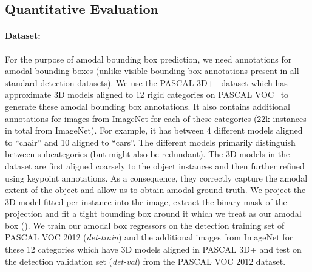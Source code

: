 \subsection{Quantitative Evaluation}
\paragraph{Dataset:} For the purpose of amodal bounding box prediction, we need annotations for amodal bounding boxes (unlike visible bounding box annotations present in all standard detection datasets). We use the PASCAL 3D+~\cite{pascal3d} dataset which has approximate 3D models aligned to 12 rigid categories on PASCAL VOC~\cite{pascal-voc-2012} to generate these amodal bounding box annotations. It also contains additional annotations for images from ImageNet \cite{imagenet_cvpr09} for each of these categories (22k instances in total from ImageNet). For example, it has between 4 different models aligned to ``chair'' and 10 aligned to ``cars''. The different models primarily distinguish between subcategories (but might also be redundant). The 3D models in the dataset are first aligned coarsely to the object instances and then further refined using keypoint annotations. As a consequence, they correctly capture the amodal extent of the object and allow us to obtain amodal ground-truth.  We project the 3D model fitted per instance into the image, extract the binary mask of the projection and fit a tight bounding box around it which we treat as our amodal box (). We train our amodal box regressors on the detection training set of PASCAL VOC 2012 (\textit{det-train}) and the additional images from ImageNet for these 12 categories which have 3D models aligned in PASCAL 3D+ and test on the detection validation set (\textit{det-val}) from the PASCAL VOC 2012 dataset.

